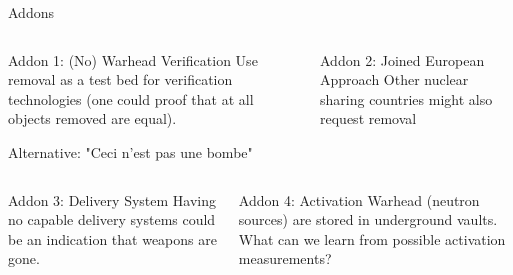 \documentclass[presentation]{beamer}
\begin{document}
\begin{frame}[label={sec:orgfb8d5e3}]{Addons}
\begin{columns}[T]
\begin{column}{0.45\columnwidth}
\begin{block}{Addon 1: (No) Warhead Verification}
Use removal as a test bed for verification technologies (one could proof that at all objects removed are equal). 

Alternative: "Ceci n'est pas une bombe"
\end{block}
\end{column}

\begin{column}{0.45\columnwidth}
\begin{block}{Addon 2: Joined European Approach}
Other nuclear sharing countries might also request removal
\end{block}
\end{column}
\end{columns}

\vspace{0.8cm}

\begin{columns}[T]
\begin{column}{0.45\columnwidth}
\begin{block}{Addon 3: Delivery System}
Having no capable delivery systems could be an indication that weapons are gone.
\end{block}
\end{column}

\begin{column}{0.45\columnwidth}
\begin{block}{Addon 4: Activation}
Warhead (neutron sources) are stored in underground vaults. What can we learn from possible activation measurements?
\end{block}
\end{column}
\end{columns}
\end{frame}
\end{document}
